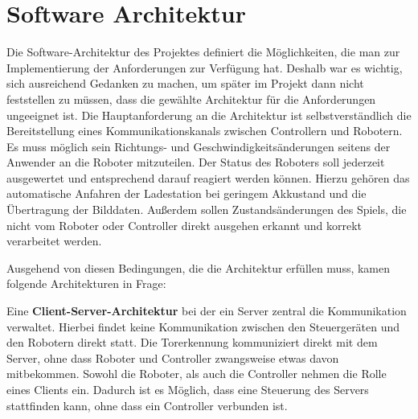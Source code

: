 \section{Software Architektur}
\label{sec:software-architektur}

Die Software-Architektur des Projektes definiert die Möglichkeiten, die man zur Implementierung der Anforderungen zur Verfügung hat. Deshalb war es wichtig, sich ausreichend Gedanken zu machen, um später im Projekt dann nicht feststellen zu müssen, dass die gewählte Architektur für die Anforderungen ungeeignet ist. Die Hauptanforderung an die Architektur ist selbstverständlich die Bereitstellung eines Kommunikationskanals zwischen Controllern und Robotern. Es muss möglich sein Richtungs- und Geschwindigkeitsänderungen seitens der Anwender an die Roboter mitzuteilen. Der Status des Roboters soll jederzeit ausgewertet und entsprechend darauf reagiert werden können. Hierzu gehören das automatische Anfahren der Ladestation bei geringem Akkustand und die Übertragung der Bilddaten. Außerdem sollen Zustandsänderungen des Spiels, die nicht vom Roboter oder Controller direkt ausgehen erkannt und korrekt verarbeitet werden. 

Ausgehend von diesen Bedingungen, die die Architektur erfüllen muss, kamen folgende Architekturen in Frage:

Eine \textbf{Client-Server-Architektur} bei der ein Server zentral die Kommunikation verwaltet. Hierbei findet keine Kommunikation zwischen den Steuergeräten und den Robotern direkt statt. Die Torerkennung kommuniziert direkt mit dem Server, ohne dass Roboter und Controller zwangsweise etwas davon mitbekommen. Sowohl die Roboter, als auch die Controller nehmen die Rolle eines Clients ein. Dadurch ist es Möglich, dass eine Steuerung des Servers stattfinden kann, ohne dass ein Controller verbunden ist. 